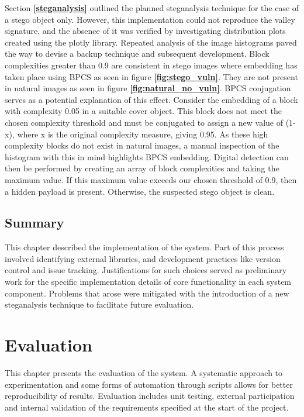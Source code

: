 \documentclass{l4proj}
\begin{document}
Section \textbf{\ref{steganalysis}} outlined the planned steganalysis technique for the case of a stego object only. However, this implementation could not reproduce the valley signature, and the absence of it was verified by investigating distribution plots created using the plotly library. Repeated analysis of the image histograms paved the way to devise a backup technique and subsequent development. Block complexities greater than 0.9 are consistent in stego images where embedding has taken place using BPCS as seen in figure \textbf{\ref{fig:stego_vuln}}. They are not present in natural images as seen in figure \textbf{\ref{fig:natural_no_vuln}}. BPCS conjugation serves as a potential explanation of this effect. Consider the embedding of a block with complexity 0.05 in a suitable cover object. This block does not meet the chosen complexity threshold and must be conjugated to assign a new value of (1-x), where x is the original complexity measure, giving 0.95.  As these high complexity blocks do not exist in natural images, a manual inspection of the histogram with this in mind highlights BPCS embedding. Digital detection can then be performed by creating an array of block complexities and taking the maximum value. If this maximum value exceeds our chosen threshold of 0.9, then a hidden payload is present. Otherwise, the suspected stego object is clean.

\section{Summary}

This chapter described the implementation of the system. Part of this process involved identifying external libraries, and development practices like version control and issue tracking. Justifications for such choices served as preliminary work for the specific implementation details of core functionality in each system component. Problems that arose were mitigated with the introduction of a new steganalysis technique to facilitate future evaluation.
 
\chapter{Evaluation} 

This chapter presents the evaluation of the system. A systematic approach to experimentation and some forms of automation through scripts allows for better reproducibility of results. Evaluation includes unit testing, external participation and internal validation of the requirements specified at the start of the project. 
 
\end{document}
